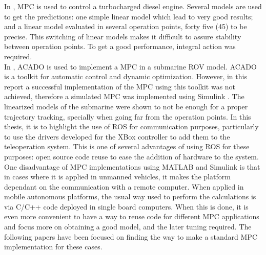 In \cite{Kristoffersson2006}, MPC is used to control a turbocharged diesel engine. Several models are used to get the predictions: one simple linear model which lead to very good results; and a linear model evaluated in several operation points, forty five (45) to be precise. This switching of linear models makes it difficult to assure stability between operation points. To get a good performance, integral action was required.\\

In \cite{Johansson2012}, ACADO is used to implement a MPC in a submarine ROV model. ACADO is a toolkit for automatic control and dynamic optimization. However, in this report a successful implementation of the MPC using this toolkit was not achieved, therefore a simulated MPC was implemented using Simulink \textsuperscript{\textregistered}. The linearized models of the submarine were shown to not be enough for a proper trajectory tracking, specially when going far from the operation points. In this thesis, it is to highlight the use of ROS for communication purposes, particularly to use the drivers developed for the XBox controller to add them to the teleoperation system. This is one of several advantages of using ROS for these purposes: open source code reuse to ease the addition of hardware to the system.\\

One disadvantage of MPC implementations using MATLAB \textsuperscript{\textregistered} and Simulink \textsuperscript{\textregistered} is that in cases where it is applied in unmanned vehicles, it makes the platform dependant on the communication with a remote computer. When applied in mobile autonomous platforms, the usual way used to perform the calculations is via C/C++ code deployed in single board computers. When this is done, it is even more convenient to have a way to reuse code for different MPC applications and focus more on obtaining a good model, and the later tuning required. The following papers have been focused on finding the way to make a standard MPC implementation for these cases. \\

